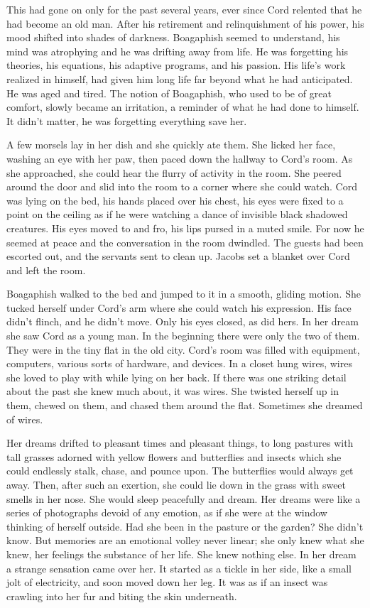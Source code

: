 This had gone on only for the past several years, ever since Cord
relented that he had become an old man. After his retirement and
relinquishment of his power, his mood shifted into shades of darkness.
Boagaphish seemed to understand, his mind was atrophying and he was
drifting away from life. He was forgetting his theories, his equations,
his adaptive programs, and his passion. His life's work realized in
himself, had given him long life far beyond what he had anticipated. He
was aged and tired. The notion of Boagaphish, who used to be of great
comfort, slowly became an irritation, a reminder of what he had done to
himself. It didn't matter, he was forgetting everything save her.

A few morsels lay in her dish and she quickly ate them. She licked her
face, washing an eye with her paw, then paced down the hallway to Cord's
room. As she approached, she could hear the flurry of activity in the
room. She peered around the door and slid into the room to a corner
where she could watch. Cord was lying on the bed, his hands placed over
his chest, his eyes were fixed to a point on the ceiling as if he were
watching a dance of invisible black shadowed creatures. His eyes moved
to and fro, his lips pursed in a muted smile. For now he seemed at peace
and the conversation in the room dwindled. The guests had been escorted
out, and the servants sent to clean up. Jacobs set a blanket over Cord
and left the room.

Boagaphish walked to the bed and jumped to it in a smooth, gliding
motion. She tucked herself under Cord's arm where she could watch his
expression. His face didn't flinch, and he didn't move. Only his eyes
closed, as did hers. In her dream she saw Cord as a young man. In the
beginning there were only the two of them. They were in the tiny flat in
the old city. Cord's room was filled with equipment, computers, various
sorts of hardware, and devices. In a closet hung wires, wires she loved
to play with while lying on her back. If there was one striking detail
about the past she knew much about, it was wires. She twisted herself up
in them, chewed on them, and chased them around the flat. Sometimes she
dreamed of wires.

Her dreams drifted to pleasant times and pleasant things, to long
pastures with tall grasses adorned with yellow flowers and butterflies
and insects which she could endlessly stalk, chase, and pounce upon. The
butterflies would always get away. Then, after such an exertion, she
could lie down in the grass with sweet smells in her nose. She would
sleep peacefully and dream. Her dreams were like a series of photographs
devoid of any emotion, as if she were at the window thinking of herself
outside. Had she been in the pasture or the garden? She didn't know. But
memories are an emotional volley never linear; she only knew what she
knew, her feelings the substance of her life. She knew nothing else. In
her dream a strange sensation came over her. It started as a tickle in
her side, like a small jolt of electricity, and soon moved down her leg.
It was as if an insect was crawling into her fur and biting the skin
underneath.


